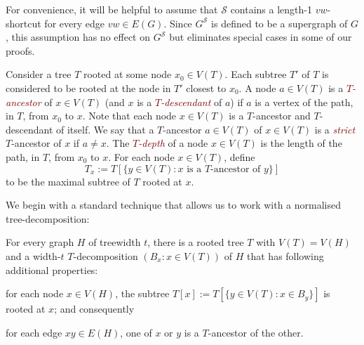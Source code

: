 \documentclass{patmorin}
\newcommand{\defin}[1]{\textcolor{Maroon}{\emph{#1}}}
\newcommand{\tlabel}[1]{\label{t:#1}}
\renewcommand{\SS}{\mathcal{S}}
\renewcommand{\le}{\leqslant}
\begin{document}
For convenience, it will be helpful to assume that $\SS$ contains a length-1 $vw$-shortcut for every edge $vw\in E(G)$.  Since $G^\SS$ is defined to be a supergraph of $G$, this assumption has no effect on $G^{\SS}$ but eliminates special cases in some of our proofs.

Consider a tree $T$ rooted at some node $x_0\in V(T)$. Each subtree $T'$ of $T$ is considered to be rooted at the node in $T'$ closest to $x_0$. A node $a\in V(T)$ is a \defin{$T$-ancestor} of $x\in V(T)$ (and $x$ is a \defin{$T$-descendant} of $a$) if $a$ is a vertex of the path, in $T$, from $x_0$ to $x$.  Note that each node $x\in V(T)$ is a $T$-ancestor and $T$-descendant of itself.  We say that a $T$-ancestor $a\in V(T)$ of $x\in V(T)$ is a \defin{strict} $T$-ancestor of $x$ if $a\neq x$.
The \defin{$T$-depth} of a node $x\in V(T)$ is the length of the path, in $T$, from $x_0$ to $x$.  For each node $x\in V(T)$, define
\[T_x := T[\{y\in V(T):\mbox{$x$ is a $T$-ancestor of $y$}\}] \]
to be the maximal subtree of $T$ rooted at $x$.

We begin with a standard technique that allows us to work with a normalised tree-decomposition:

\begin{lem}
  For every graph $H$ of treewidth $t$, there is a rooted tree $T$ with $V(T)=V(H)$ and a width-$t$ $T$-decomposition $(B_x:x\in V(T))$ of $H$ that has following additional properties:
  \begin{compactenum}[(T1)]
    \item\tlabel{subtree-root} for each node $x\in V(H)$, the subtree $T[x]:=T[\{y\in V(T):x\in B_y\}]$ is rooted at $x$; and consequently
    \item\tlabel{ancestor-edge}\tlabel{last} for each edge $xy\in E(H)$, one of $x$ or $y$ is a $T$-ancestor of the other.
  \end{compactenum}
\end{lem}
\end{document}
